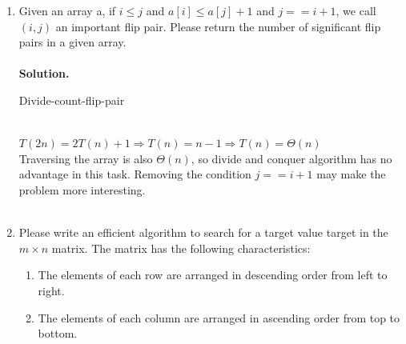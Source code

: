 \documentclass{article}
\newtheorem*{solution}{Solution}
\renewenvironment{solution}[1][Solution]{~\\ \textbf{#1.}}{~\\}
\begin{document}
\begin{enumerate}
\newpage
\item Given an array a, if $i \leq j$ and $a[i] \leq a[j] + 1$ and $j == i+1$, we call $(i, j)$ an important flip pair. Please return the number of significant flip pairs in a given array.
~\\
\begin{solution}
    ~\\
    \begin{minipage}[H]{0.8\textwidth}
    \begin{algorithm}[H]
    \caption{Divide-count-flip-pair}
    \label{flip-pair}
    \BlankLine
    \end{algorithm}    
    \end{minipage}\\
    $T(2n)=2T(n)+1\Rightarrow T(n)=n-1\Rightarrow T(n)=\Theta(n)$\\
    Traversing the array is also $\Theta(n)$, so divide and conquer algorithm has no advantage in this task. Removing the condition $j==i+1$ may make the problem more interesting.
\end{solution}
~\\

\newpage
\item  Please write an efficient algorithm to search for a target value target in the $m \times n$ matrix. The matrix has the following characteristics:
\begin{enumerate}
\item
The elements of each row are arranged in descending order from left to right.
\item
The elements of each column are arranged in ascending order from top to bottom.
\end{enumerate}
    

\end{enumerate}
\end{document}
